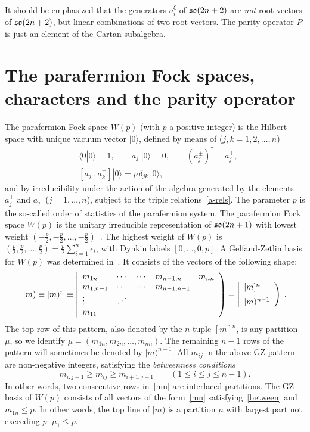 \documentclass{SciPost}
\begin{document}
It should be emphasized that the generators $a_i^\xi$ of $\mathfrak{so}(2n+2)$ are {\em not} root vectors of $\mathfrak{so}(2n+2)$, but linear combinations of two root vectors.
The parity operator $P$ is just an element of the Cartan subalgebra.

\setcounter{equation}{0}
\section{The parafermion Fock spaces, characters and the parity operator}
\label{sec4}

The parafermion Fock space $W(p)$ (with $p$ a positive integer) 
is the Hilbert space with unique vacuum vector $|0\rangle$, 
defined by means of ($j,k=1,2,\ldots,n$)~\cite{Green, GM}
\begin{align}
& \langle 0|0\rangle=1, \qquad a_j^- |0\rangle = 0, \qquad (a_j^\pm)^\dagger = a_j^\mp,\nonumber\\
& [a_j^-,a_k^+] |0\rangle = p\,\delta_{jk}\,|0\rangle,
\label{pFock}
\end{align}
and by irreducibility under the action of the algebra generated by
the elements $a_j^+$ and $a_j^-$ ($j=1,\ldots,n$), subject to the triple relations~\eqref{a-rels}.
The parameter $p$ is the so-called order of statistics of the parafermion system.
The parafermion Fock space $W(p)$ is the unitary irreducible representation of
$\mathfrak{so}(2n+1)$ with lowest weight $(-\frac{p}{2}, -\frac{p}{2},\ldots, -\frac{p}{2})$~\cite{parafermion}.
The highest weight of $W(p)$ is $(\frac{p}{2}, \frac{p}{2},\ldots, \frac{p}{2})=\frac{p}{2}\sum_{i=1}^n \epsilon_i$, with Dynkin labels $[0,\ldots,0,p]$.
A Gelfand-Zetlin basis for $W(p)$ was determined in~\cite{parafermion}.
It consists of the vectors of the following shape:
\begin{equation}
 |m)\equiv |m)^n\equiv \left|
\begin{array}{lcllll}
 m_{1n} & \cdots & \cdots & m_{n-1,n} & m_{nn}  \\
 m_{1,n-1} & \cdots & \cdots &  m_{n-1,n-1}  &  \\
\vdots & \qdots & & & \\
m_{11} & & & &
\end{array}
\right) 
= \left| \begin{array}{l} [m]^n \\[2mm] |m)^{n-1} \end{array} \right) \;.
\label{mn}
\end{equation}
The top row of this pattern, also denoted by the $n$-tuple $[m]^n$, is any
partition $\mu$, so we identify $\mu=(m_{1n}, m_{2n},\ldots, m_{nn})$. 
The remaining $n-1$ rows of the pattern will sometimes be denoted by $|m)^{n-1}$.
All $m_{ij}$ in the above GZ-pattern are non-negative integers,
satisfying the {\em betweenness conditions}
\begin{equation}
m_{i,j+1}\geq m_{ij}\geq m_{i+1,j+1}\qquad (1\leq i\leq j\leq n-1).
\label{between}
\end{equation}
In other words, two consecutive rows in~\eqref{mn} are interlaced partitions.
The GZ-basis of $W(p)$ consists of all vectors of the form~\eqref{mn} satisfying~\eqref{between} and $m_{1n}\leq p$. 
In other words, the top line of $|m)$ is a
partition $\mu$ with largest part not exceeding $p$: $\mu_1\leq p$.
\end{document}
